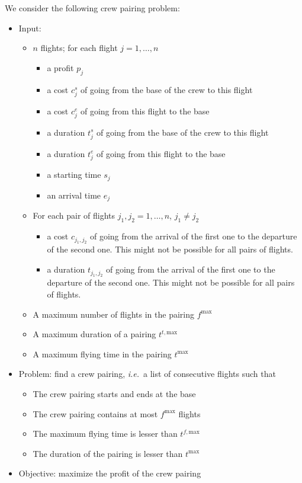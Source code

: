 \documentclass[a4paper,twocolumn]{article}
\begin{document}
We consider the following crew pairing problem:
\begin{itemize}
  \item Input:
    \begin{itemize}
      \item $n$ flights; for each flight $j = 1, \dots, n$
        \begin{itemize}
          \item a profit $p_j$
          \item a cost $c^s_j$ of going from the base of the crew to this flight
          \item a cost $c^e_j$ of going from this flight to the base
          \item a duration $t^s_j$ of going from the base of the crew to this flight
          \item a duration $t^e_j$ of going from this flight to the base
          \item a starting time $s_j$
          \item an arrival time $e_j$
        \end{itemize}
      \item For each pair of flights $j_1, j_2 = 1, \dots, n$, $j_1 \neq j_2$
        \begin{itemize}
          \item a cost $c_{j_1, j_2}$ of going from the arrival of the first one to the departure of the second one. This might not be possible for all pairs of flights.
          \item a duration $t_{j_1, j_2}$ of going from the arrival of the first one to the departure of the second one. This might not be possible for all pairs of flights.
        \end{itemize}
      \item A maximum number of flights in the pairing $f^\text{max}$
      \item A maximum duration of a pairing $t^{t, \text{max}}$
      \item A maximum flying time in the pairing $t^\text{max}$
    \end{itemize}
  \item Problem: find a crew pairing, \textit{i.e.}\ a list of consecutive flights such that
    \begin{itemize}
      \item The crew pairing starts and ends at the base
      \item The crew pairing contains at most $f^\text{max}$ flights
      \item The maximum flying time is lesser than $t^{f, \text{max}}$
      \item The duration of the pairing is lesser than $t^{\text{max}}$
    \end{itemize}
  \item Objective: maximize the profit of the crew pairing
\end{itemize}
\end{document}
